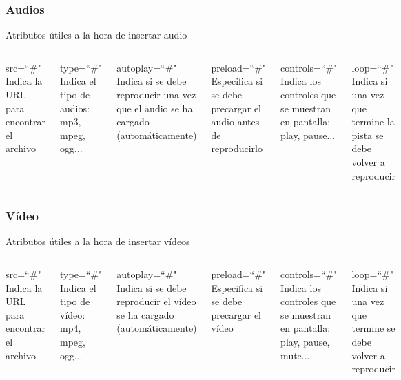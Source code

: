 \documentclass{beamer}
\begin{document}
\begin{frame}[fragile]
\frametitle{Audios}
	Atributos útiles a la hora de insertar audio
	\begin{columns}[c]
	\begin{block}{src=``\#"}
	Indica la URL para encontrar el archivo
	\end{block}
	\begin{block}{type=``\#"}
	Indica el tipo de audios: mp3, mpeg, ogg...
	\end{block}
	\begin{block}{autoplay=``\#"}
	Indica si se debe reproducir una vez que el audio se ha cargado (automáticamente)
	\end{block}
	\begin{block}{preload=``\#"}
	Especifica si se debe precargar el audio antes de reproducirlo
	\end{block}
	\begin{block}{controls=``\#"}
	Indica los controles que se muestran en pantalla: play, pause...
	\end{block}
	\begin{block}{loop=``\#"}
	Indica si una vez que termine la pista se debe volver a reproducir
	\end{block}	
	\end{columns}
\end{frame}	

\begin{frame}[fragile]
\frametitle{Vídeo}
	Atributos útiles a la hora de insertar vídeos
	\begin{columns}[c]
	\begin{block}{src=``\#"}
	Indica la URL para encontrar el archivo
	\end{block}
	\begin{block}{type=``\#"}
	Indica el tipo de vídeo: mp4, mpeg, ogg...
	\end{block}
	\begin{block}{autoplay=``\#"}
	Indica si se debe reproducir el vídeo se ha cargado (automáticamente)
	\end{block}
	\begin{block}{preload=``\#"}
	Especifica si se debe precargar el vídeo
	\end{block}
	\begin{block}{controls=``\#"}
	Indica los controles que se muestran en pantalla: play, pause, mute...
	\end{block}
	\begin{block}{loop=``\#"}
	Indica si una vez que termine se debe volver a reproducir
	\end{block}	
	\end{columns}
\end{frame}	
\end{document}
